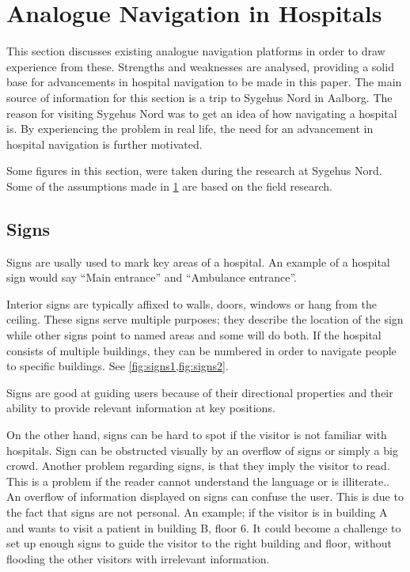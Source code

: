 \section{Analogue Navigation in Hospitals} %
\label{sec:anal_nav}
This section discusses existing analogue navigation platforms in order to draw experience from these. Strengths and weaknesses are analysed, providing a solid base for advancements in hospital navigation to be made in this paper. The main source of information for this section is a trip to Sygehus Nord in Aalborg. The reason for visiting Sygehus Nord was to get an idea of how navigating a hospital is. By experiencing the problem in real life, the need for an advancement in hospital navigation is further motivated.

Some figures in this section, were taken during the research at Sygehus Nord. Some of the assumptions made in \cref{sec:anal_nav} are based on the field research.

\subsection{Signs} \label{sub:sign}
Signs are usally used to mark key areas of a hospital. An example of a hospital sign would say \enquote{Main entrance} and \enquote{Ambulance entrance}\cite{signs_hospital,art_Osborne}.

Interior signs are typically affixed to walls, doors, windows or hang from the ceiling. These signs serve multiple purposes; they describe the location of the sign while other signs point to named areas and some will do both. If the hospital consists of multiple buildings, they can be numbered in order to navigate people to specific buildings. See \cref{fig:signs1,fig:signs2}.

Signs are good at guiding users because of their directional properties and their ability to provide relevant information at key positions.

On the other hand, signs can be hard to spot if the visitor is not familiar with hospitals. Sign can be obstructed visually by an overflow of signs or simply a big crowd. Another problem regarding signs, is that they imply the visitor to read. This is a problem if the reader cannot understand the language or is illiterate.\cite{signs_reading}. An overflow of information displayed on signs can confuse the user. This is due to the fact that signs are not personal.
An example; if the visitor is in building A and wants to visit a patient in building B, floor 6. It could become a challenge to set up enough signs to guide the visitor to the right building and floor, without flooding the other visitors with irrelevant information.

